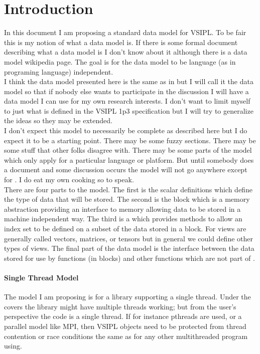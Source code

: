 \section{Introduction}
In this document I am proposing a standard data model for VSIPL. To be fair this is my notion of what a data model is. If there is some formal document describing what a data model is I don't know about it although there is a data model wikipedia page. The goal is for the data model to be language (as in programing language) independent.
\\[6pt]
I think the data model presented here is the same as in \cvl{} but I will call it the \jv{} data model so that if nobody else wants to participate in the discussion I will have a data model I can use for my own research interests.  I don't want to limit myself to just what is defined in the VSIPL 1p3 specification but I will try to generalize the ideas so they may be extended.
\\[6pt]
I don't expect this model to necessarily be complete as described here but I do expect it to be a starting point.  There may be some fuzzy sections. There may be some stuff that other folks disagree with. There may be some parts of the model which only apply for a particular language or platform.  But until somebody does a document and some discussion occurs the model will not go anywhere except for \jv{}.  I do eat my own cooking so to speak.
\\[6pt]
There are four parts to the model. The first is the scalar definitions which define the type of data that will be stored. The second is the block which is a memory abstraction providing an interface to memory allowing data to be stored in a machine independent way. The third is a \Vw{} which provides methods to allow an index set to be defined on a subset of the data stored in a block. For \cvl{} views are generally called vectors, matrices, or tensors but in general we could define other types of views. The final part of the data model is the interface between the data stored for use by \cvl{} functions (in blocks) and other functions which are not part of \cvl{}.
\paragraph{Single Thread Model}
The model I am proposing is for a library supporting a single thread. Under the covers the library might have multiple threads working; but from the user's perspective the code is a single thread.  If for instance pthreads are used, or a parallel model like MPI, then  VSIPL objects need to be protected from thread contention or race conditions the same as for any other multithreaded program using.


